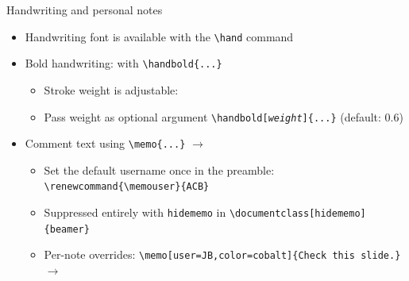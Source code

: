 \documentclass[10pt,itemsep]{beamer}
\begin{document}
\begin{frame}
    {Handwriting and personal notes}
    \begin{itemize}
        \item {\hand Handwriting font} is available with the \texttt{\textbackslash hand} command
        \item Bold handwriting:  with \texttt{\textbackslash handbold\{...\}}
        \begin{itemize}
            \item Stroke weight is adjustable:  \quad {} \quad {}
            \item Pass weight as optional argument \texttt{\textbackslash handbold[\textit{weight}]\{...\}} (default: 0.6)
        \end{itemize}
        \item Comment text using \texttt{\textbackslash memo\{...\}} $\rightarrow$ 
        \begin{itemize}
            \item Set the default username once in the preamble: \texttt{\textbackslash renewcommand\{\textbackslash memouser\}\{ACB\}}
            \item Suppressed entirely with \texttt{hidememo} in \texttt{\textbackslash documentclass[hidememo]\{beamer\}}
            \item Per-note overrides: \texttt{\textbackslash memo[user=JB,color=cobalt]\{Check this slide.\}} $\rightarrow$ 
        \end{itemize}
    \end{itemize}
\end{frame}
\shownotesblock{}
\end{document}
